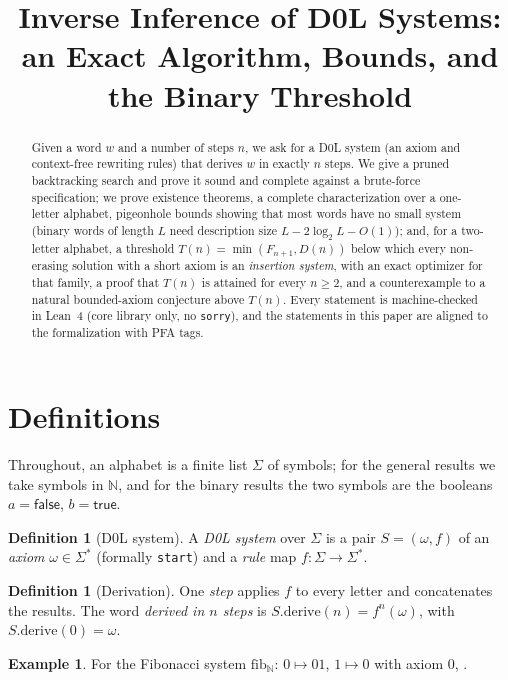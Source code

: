 \documentclass[11pt]{article}
\title{Inverse Inference of D0L Systems:\\ an Exact Algorithm, Bounds, and the Binary Threshold}
\author{}
\date{}
\theoremstyle{definition}
\newtheorem{definition}[theorem]{Definition}
\newtheorem{example}[theorem]{Example}
\theoremstyle{remark}
\newcommand{\N}{\mathbb{N}}
\begin{document}
\maketitle

\begin{abstract}
Given a word $w$ and a number of steps $n$, we ask for a D0L system (an axiom and
context-free rewriting rules) that derives $w$ in exactly $n$ steps. We give a pruned
backtracking search and prove it sound and complete against a brute-force specification;
we prove existence theorems, a complete characterization over a one-letter alphabet, pigeonhole
bounds showing that most words have no small system (binary words of length $L$ need description
size $L-2\log_2L-O(1)$); and, for a two-letter alphabet, a threshold $T(n)=\min(F_{n+1},D(n))$
below which every non-erasing solution with a short axiom is an \emph{insertion system}, with an
exact optimizer for that family, a proof that $T(n)$ is attained for every $n\ge2$, and a
counterexample to a natural bounded-axiom conjecture above $T(n)$. Every statement is machine-checked in Lean~4
(core library only, no \texttt{sorry}), and the statements in this paper are aligned to the
formalization with PFA tags.
\end{abstract}

\section{Definitions}

Throughout, an alphabet is a finite list $\Sigma$ of symbols; for the general results we take
symbols in $\N$, and for the binary results the two symbols are the booleans
$a=\mathsf{false}$, $b=\mathsf{true}$.

\begin{definition}[D0L system]
A \emph{D0L system} over $\Sigma$ is a pair $S=(\omega,f)$ of an \emph{axiom}
$\omega\in\Sigma^*$ (formally \texttt{start}) and a \emph{rule} map $f:\Sigma\to\Sigma^*$.
\end{definition}

\begin{definition}[Derivation]
One \emph{step} applies $f$ to every letter and concatenates the results. The word
\emph{derived in $n$ steps} is $S.\mathrm{derive}(n)=f^{n}(\omega)$, with
$S.\mathrm{derive}(0)=\omega$.
\end{definition}

\begin{example}
For the Fibonacci system $\mathrm{fib}_\N$: $0\mapsto 01$, $1\mapsto 0$ with axiom $0$,
.
\end{example}
\end{document}
